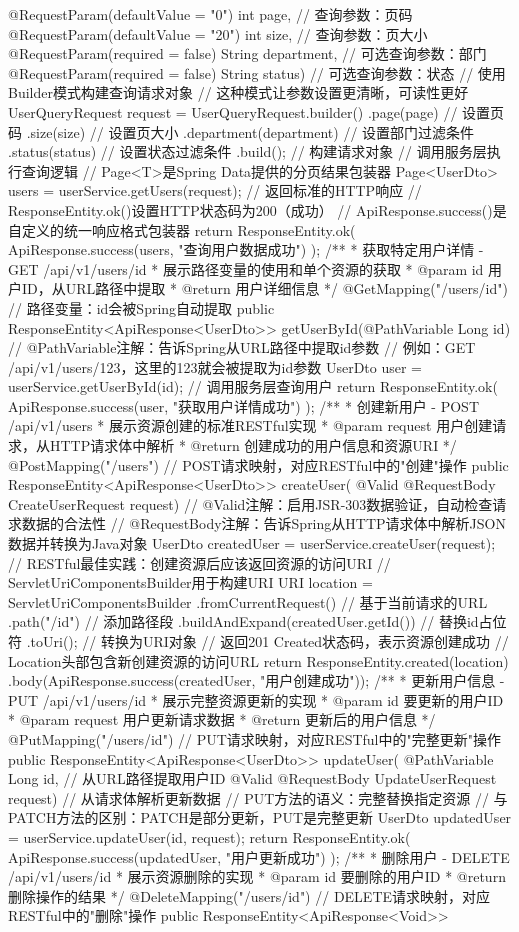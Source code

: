 @RequestParam(defaultValue = "0") int page, // 查询参数：页码 @RequestParam(defaultValue = "20") int size, // 查询参数：页大小 @RequestParam(required = false) String department, // 可选查询参数：部门 @RequestParam(required = false) String status) { // 可选查询参数：状态 // 使用Builder模式构建查询请求对象 // 这种模式让参数设置更清晰，可读性更好 UserQueryRequest request = UserQueryRequest.builder() .page(page) // 设置页码 .size(size) // 设置页大小 .department(department) // 设置部门过滤条件 .status(status) // 设置状态过滤条件 .build(); // 构建请求对象 // 调用服务层执行查询逻辑 // Page<T>是Spring Data提供的分页结果包装器 Page<UserDto> users = userService.getUsers(request); // 返回标准的HTTP响应 // ResponseEntity.ok()设置HTTP状态码为200（成功） // ApiResponse.success()是自定义的统一响应格式包装器 return ResponseEntity.ok( ApiResponse.success(users, "查询用户数据成功") ); } /** * 获取特定用户详情 - GET /api/v1/users/{id} * 展示路径变量的使用和单个资源的获取 * @param id 用户ID，从URL路径中提取 * @return 用户详细信息 */ @GetMapping("/users/{id}") // 路径变量：{id}会被Spring自动提取 public ResponseEntity<ApiResponse<UserDto>> getUserById(@PathVariable Long id) { // @PathVariable注解：告诉Spring从URL路径中提取id参数 // 例如：GET /api/v1/users/123，这里的123就会被提取为id参数 UserDto user = userService.getUserById(id); // 调用服务层查询用户 return ResponseEntity.ok( ApiResponse.success(user, "获取用户详情成功") ); } /** * 创建新用户 - POST /api/v1/users * 展示资源创建的标准RESTful实现 * @param request 用户创建请求，从HTTP请求体中解析 * @return 创建成功的用户信息和资源URI */ @PostMapping("/users") // POST请求映射，对应RESTful中的"创建"操作 public ResponseEntity<ApiResponse<UserDto>> createUser( @Valid @RequestBody CreateUserRequest request) { // @Valid注解：启用JSR-303数据验证，自动检查请求数据的合法性 // @RequestBody注解：告诉Spring从HTTP请求体中解析JSON数据并转换为Java对象 UserDto createdUser = userService.createUser(request); // RESTful最佳实践：创建资源后应该返回资源的访问URI // ServletUriComponentsBuilder用于构建URI URI location = ServletUriComponentsBuilder .fromCurrentRequest() // 基于当前请求的URL .path("/{id}") // 添加路径段 .buildAndExpand(createdUser.getId()) // 替换{id}占位符 .toUri(); // 转换为URI对象 // 返回201 Created状态码，表示资源创建成功 // Location头部包含新创建资源的访问URL return ResponseEntity.created(location) .body(ApiResponse.success(createdUser, "用户创建成功")); } /** * 更新用户信息 - PUT /api/v1/users/{id} * 展示完整资源更新的实现 * @param id 要更新的用户ID * @param request 用户更新请求数据 * @return 更新后的用户信息 */ @PutMapping("/users/{id}") // PUT请求映射，对应RESTful中的"完整更新"操作 public ResponseEntity<ApiResponse<UserDto>> updateUser( @PathVariable Long id, // 从URL路径提取用户ID @Valid @RequestBody UpdateUserRequest request) { // 从请求体解析更新数据 // PUT方法的语义：完整替换指定资源 // 与PATCH方法的区别：PATCH是部分更新，PUT是完整更新 UserDto updatedUser = userService.updateUser(id, request); return ResponseEntity.ok( ApiResponse.success(updatedUser, "用户更新成功") ); } /** * 删除用户 - DELETE /api/v1/users/{id} * 展示资源删除的实现 * @param id 要删除的用户ID * @return 删除操作的结果 */ @DeleteMapping("/users/{id}") // DELETE请求映射，对应RESTful中的"删除"操作 public ResponseEntity<ApiResponse<Void>> 